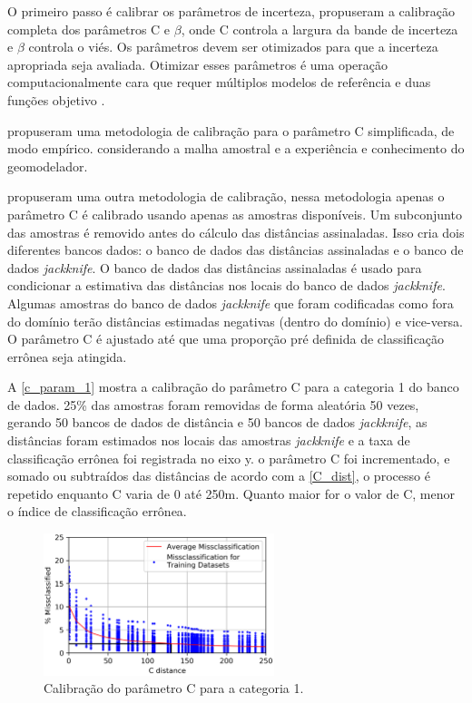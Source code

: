 O primeiro passo é calibrar os parâmetros de incerteza,  propuseram a calibração completa dos parâmetros C e $\beta$, onde C controla a largura da bande de incerteza e $\beta$ controla o viés. Os parâmetros devem ser otimizados para que a incerteza apropriada seja avaliada. Otimizar esses parâmetros é uma operação computacionalmente cara que requer múltiplos modelos de referência e duas funções objetivo \cite{wilde2012kriging}.

 propuseram uma metodologia de calibração para o parâmetro C simplificada, de modo empírico. considerando a malha amostral e a experiência e conhecimento do geomodelador.

 propuseram uma outra metodologia de calibração, nessa metodologia apenas o parâmetro C é calibrado usando apenas as amostras disponíveis. Um subconjunto das amostras é removido antes do cálculo das distâncias assinaladas. Isso cria dois diferentes bancos dados: o banco de dados das distâncias assinaladas e o banco de dados \textit{jackknife}. O banco de dados das distâncias assinaladas é usado para condicionar a estimativa das distâncias nos locais do banco de dados \textit{jackknife}. Algumas amostras do banco de dados \textit{jackknife} que foram codificadas como fora do domínio terão distâncias estimadas negativas (dentro do domínio) e vice-versa. O parâmetro C é ajustado até que uma proporção pré definida de classificação errônea seja atingida.

A \autoref{c_param_1} mostra a calibração do parâmetro C para a categoria 1 do banco de dados. 25\% das amostras foram removidas de forma aleatória 50 vezes, gerando 50 bancos de dados de distância e 50 bancos de dados \textit{jackknife}, as distâncias foram estimados nos locais das amostras \textit{jackknife} e a taxa de classificação errônea foi registrada no eixo y. o parâmetro C foi incrementado, e somado ou subtraídos das distâncias de acordo com a \autoref{C_dist}, o processo é repetido enquanto C varia de 0 até 250m. Quanto maior for o valor de C, menor o índice de classificação errônea.

\begin{figure}[H]
	\caption{\label{c_param_1}Calibração do parâmetro C para a categoria 1.}
	\begin{center}
		\includegraphics[width=0.6\textwidth]{capitulo_2/uncert_1.png}
	\end{center}
\end{figure}

